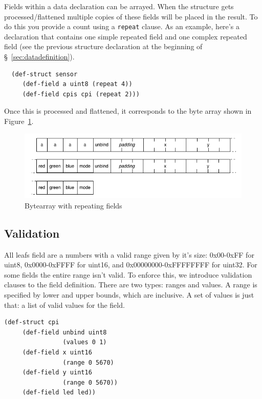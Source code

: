 \documentclass[12pt]{article}
\begin{document}
Fields within a data declaration can be arrayed. When the structure
gets processed/flattened multiple copies of these fields will be
placed in the result. To do this you provide a count using a
\verb|repeat| clause. As an example, here's a declaration that 
contains one simple repeated field and one complex repeated field 
(see the previous structure declaration at the beginning of
\S~\ref{sec:datadefinition}). 

\begin{verbatim}
  (def-struct sensor
     (def-field a uint8 (repeat 4))
     (def-field cpis cpi (repeat 2)))
\end{verbatim}

Once this is processed and flattened, it corresponds to the byte array
shown in Figure~\ref{fig:repeatingbytearray}.

\begin{figure}[htbp] %
   \centering
   \includegraphics[width=6in]{repeated_bytearray.png} 
\caption{Bytearray with repeating fields}
\label{fig:repeatingbytearray}
\end{figure}

\subsection{Validation}

All leafs field are a numbers with a valid range given by it's size:
0x00-0xFF for uint8, 0x0000-0xFFFF for uint16, and
0x00000000-0xFFFFFFFF for uint32. For some fields the entire range
isn't valid. To enforce this, we introduce validation clauses to the
field definition. There are two types: ranges and values. A range is
specified by lower and upper bounds, which are inclusive. A set of
values is just that: a list of valid values for the field. 

\begin{verbatim}
(def-struct cpi
     (def-field unbind uint8
                (values 0 1)
     (def-field x uint16
                (range 0 5670)
     (def-field y uint16
                (range 0 5670))
     (def-field led led))
\end{verbatim}
\end{document}

